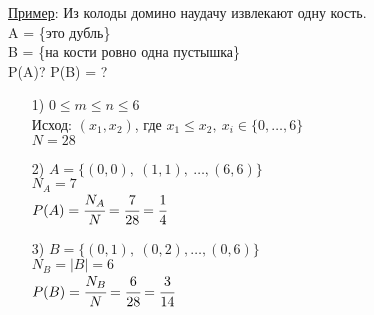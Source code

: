 \underline{Пример}: Из колоды домино наудачу извлекают одну кость. \\
A = \{это дубль\} \\
B = \{на кости ровно одна пустышка\} \\
P(A)? P(B) = ? \\

\begin{enumerate}
\item[1)] 
$0 \leqslant m \leqslant n \leqslant 6$ \\
Исход: $(x_1, x_2)$, где $x_1 \leqslant x_2, \ x_i \in \{0, \ldots , 6\}$ \\
$N = 28$ \\

\item[2)] $A = \{(0,0), \ (1,1), \ \ldots, (6,6)\}$ \\
$N_A = 7$ \\
$P(A) = \cfrac{N_A}{N} = \cfrac{7}{28} = \cfrac{1}{4}$ \\ 

\item[3)] $B = \{(0,1), \ (0,2), \ldots , (0,6)\}$ \\
$N_B = |B| = 6$ \\
$P(B) = \cfrac{N_B}{N} = \cfrac{6}{28} = \cfrac{3}{14}$ \\
\end{enumerate}

























